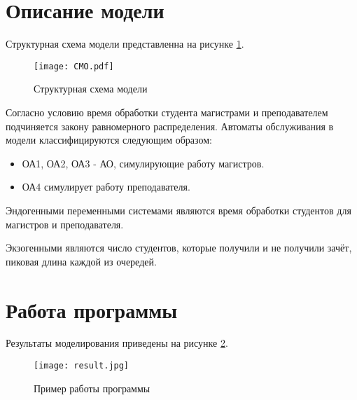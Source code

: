 \section{Описание модели}
	Структурная схема модели представленна на рисунке \ref{pic:scheme}.
	
	\begin{figure}[h]
		\begin{center}
			{\texttt{[image: СМО.pdf]}
				\caption{Структурная схема модели}
				\label{pic:scheme}}
		\end{center}
	\end{figure}
	
	Согласно условию время обработки студента магистрами и преподавателем подчиняется закону равномерного распределения. Автоматы обслуживания в модели классифицируются следующим образом:
	\begin{itemize}
		\item ОА1, ОА2, ОА3 - АО, симулирующие работу магистров.
		\item ОА4 симулирует работу преподавателя.
	\end{itemize}

	Эндогенными переменными системами являются время обработки студентов для магистров и преподавателя. 
	
	Экзогенными являются число студентов, которые получили и не получили зачёт, пиковая длина каждой из очередей.

\pagebreak
\section{Работа программы}	
	Результаты моделирования приведены на рисунке \ref{pic:res}.
	
	\begin{figure}[h]
		\begin{center}
			{\texttt{[image: result.jpg]}
				\caption{Пример работы программы}
				\label{pic:res}}
		\end{center}
	\end{figure}
	